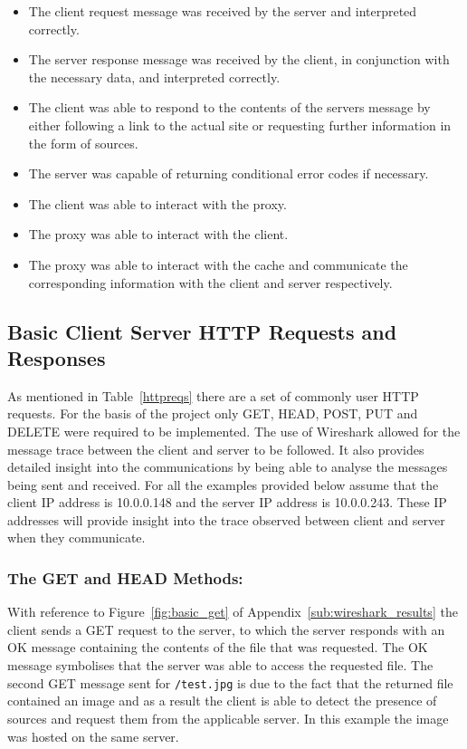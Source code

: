 \documentclass[10pt,twocolumn]{witseiepaper}
\begin{document}
	\begin{itemize}
		\item The client request message was received by the server and interpreted correctly.
		\item The server response message was received by the client, in conjunction with the necessary data, and interpreted correctly.
		\item The client was able to respond to the contents of the servers message by either following a link to the actual site or requesting further information in the form of sources.
		\item The server was capable of returning conditional error codes if necessary.
		\item The client was able to interact with the proxy.
		\item The proxy was able to interact with the client.
		\item The proxy was able to interact with the cache and communicate the corresponding information with the client and server respectively.
	\end{itemize}

	\subsection{Basic Client Server HTTP Requests and Responses} %
	\label{sub:basic_client_server}
		
		As mentioned in Table~\ref{httpreqs} there are a set of commonly user HTTP requests. For the basis of the project only GET, HEAD, POST, PUT and DELETE were required to be implemented. The use of Wireshark allowed for the message trace between the client and server to be followed. It also provides detailed insight into the communications by being able to analyse the messages being sent and received. For all the examples provided below assume that the client IP address is 10.0.0.148 and the server IP address is 10.0.0.243. These IP addresses will provide insight into the trace observed between client and server when they communicate.
		
		\subsubsection*{The GET and HEAD Methods:} With reference to Figure~\ref{fig:basic_get} of Appendix~\ref{sub:wireshark_results} the client sends a GET request to the server, to which the server responds with an OK message containing the contents of the file that was requested. The OK message symbolises that the server was able to access the requested file. The second GET message sent for \texttt{/test.jpg} is due to the fact that the returned file contained an image and as a result the client is able to detect the presence of sources and request them from the applicable server. In this example the image was hosted on the same server. \\
		
\end{document}
